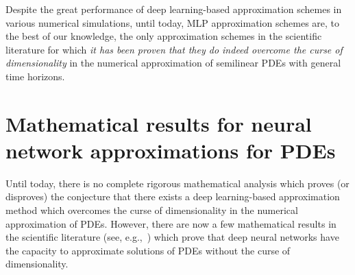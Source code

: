 \documentclass[12pt]{article}
\theoremstyle{definition}
\begin{document}
Despite the great performance of deep learning-based approximation schemes in various numerical simulations, 
until today, MLP approximation schemes 
are, to the best of our knowledge, 
the only approximation schemes 
in the scientific literature 
for which 
\emph{it has been proven that they 
do indeed overcome the curse of dimensionality}  
in the numerical approximation of semilinear PDEs with general time horizons. 





\section{Mathematical results for neural network approximations for PDEs}


Until today, there is no complete rigorous mathematical analysis 
which proves (or disproves) the conjecture that there exists 
a deep learning-based approximation method which overcomes the curse 
of dimensionality in the numerical approximation of PDEs. 
However, there are now a few mathematical results in the scientific literature 
(see, e.g.,~\cite{berner2018analysis,elbrachter2018dnn,gonon2019uniform,grohs2018proof,grohs2019deep,hutzenthaler2020proof,jentzen2018proofarxiv1809,kutyniok2019theoretical,reisinger2019rectified,HornungJentzenSalimova2020}) which prove that deep neural networks have the capacity to approximate 
solutions of PDEs without the curse of dimensionality. 
\end{document}
